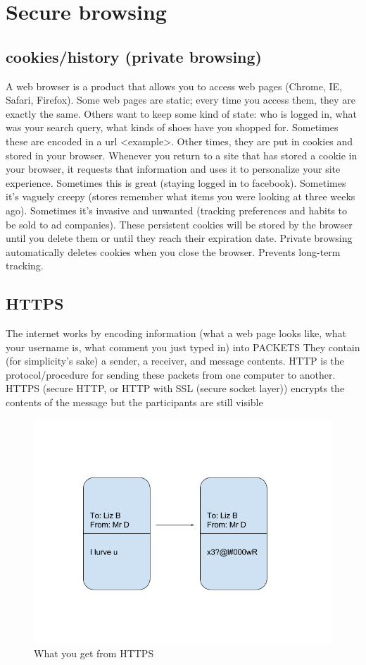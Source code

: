 \documentclass{article}
\begin{document}
\section{Secure browsing}
\subsection{cookies/history (private browsing)}
A web browser is a product that allows you to access web pages (Chrome, IE, Safari, Firefox). Some
web pages are static; every time you access them, they are exactly the same. Others want to keep
some kind of state: who is logged in, what was your search query, what kinds of shoes have you
shopped for. Sometimes these are encoded in a url <example>. Other times, they are put in cookies
and stored in your browser. Whenever you return to a site that has stored a cookie in your
browser, it requests that information and uses it to personalize your site experience.
Sometimes this is great (staying logged in to facebook). Sometimes it’s vaguely creepy (stores
remember what items you were looking at three weeks ago). Sometimes it’s invasive and unwanted
(tracking preferences and habits to be sold to ad companies). These persistent cookies will be
stored by the browser until you delete them or until they reach their expiration date. 
Private browsing automatically deletes cookies when you close the browser. Prevents long-term
tracking. 
\subsection{HTTPS}
The internet works by encoding information (what a web page looks like, what your username is,
what comment you just typed in) into PACKETS
They contain (for simplicity’s sake) a sender, a receiver, and message contents. 
HTTP is the protocol/procedure for sending these packets from one computer to another. HTTPS
(secure HTTP, or HTTP with SSL (secure socket layer)) encrypts the contents of the message but the
participants are still visible

\begin{figure}
\includegraphics[width=\textwidth]{https}
\caption{What you get from HTTPS}
\end{figure}
\end{document}
